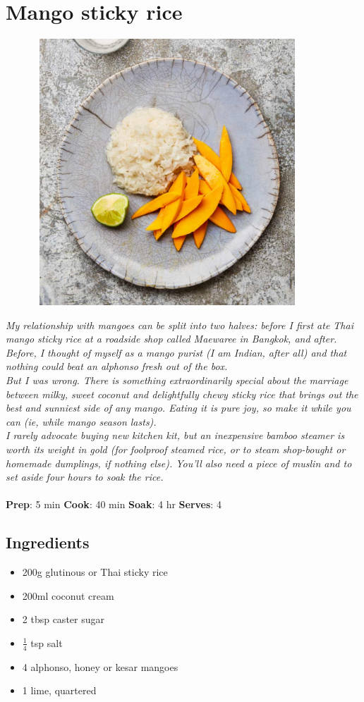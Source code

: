 \documentclass{book}
\begin{document}
\section{Mango sticky rice}
\begin{figure}
\centering\includegraphics[width=10cm,height=10cm,keepaspectratio]{Recipe_Pictures/Mango_sticky_rice.png}
\end{figure}
\emph{My relationship with mangoes can be split into two halves: before I first ate Thai mango sticky rice at a roadside shop called Maewaree in Bangkok, and after. \\ 
Before, I thought of myself as a mango purist (I am Indian, after all) and that nothing could beat an alphonso fresh out of the box. \\ 
But I was wrong. There is something extraordinarily special about the marriage between milky, sweet coconut and delightfully chewy sticky rice that brings out the best and sunniest side of any mango. Eating it is pure joy, so make it while you can (ie, while mango season lasts).\\ 
I rarely advocate buying new kitchen kit, but an inexpensive bamboo steamer is worth its weight in gold (for foolproof steamed rice, or to steam shop-bought or homemade dumplings, if nothing else). You’ll also need a piece of muslin and to set aside four hours to soak the rice. }\\\\ 
\textbf{Prep}: 5 min
\textbf{Cook}: 40 min
\textbf{Soak}: 4 hr
\textbf{Serves}: 4
\subsection*{Ingredients}
\begin{itemize}
\item 200g glutinous or Thai sticky rice
\item 200ml coconut cream
\item 2 tbsp caster sugar
\item $\frac{1}{4}$ tsp salt
\item 4 alphonso, honey or kesar mangoes
\item 1 lime, quartered
\end{itemize}
\end{document}
